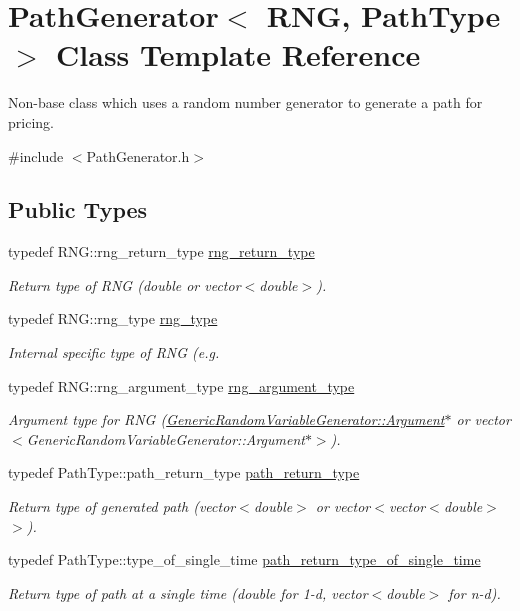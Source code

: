 \hypertarget{class_path_generator}{}\section{Path\+Generator$<$ R\+NG, Path\+Type $>$ Class Template Reference}
\label{class_path_generator}


Non-\/base class which uses a random number generator to generate a path for pricing.  




{\ttfamily \#include $<$Path\+Generator.\+h$>$}

\subsection*{Public Types}
\begin{DoxyCompactItemize}
\item 
typedef R\+N\+G\+::rng\+\_\+return\+\_\+type \hyperlink{class_path_generator_aa97ab7e55299daa0f38539816f171369}{rng\+\_\+return\+\_\+type}
\begin{DoxyCompactList}\small\item\em Return type of R\+NG (double or vector$<$double$>$). \end{DoxyCompactList}\item 
typedef R\+N\+G\+::rng\+\_\+type \hyperlink{class_path_generator_a7e71cbb5376b07b319b1f042a1035335}{rng\+\_\+type}
\begin{DoxyCompactList}\small\item\em Internal specific type of R\+NG (e.\+g. \end{DoxyCompactList}\item 
typedef R\+N\+G\+::rng\+\_\+argument\+\_\+type \hyperlink{class_path_generator_a2f6a701b324534da9f05ccc11c320e6b}{rng\+\_\+argument\+\_\+type}
\begin{DoxyCompactList}\small\item\em Argument type for R\+NG (\hyperlink{class_generic_random_variable_generator_1_1_argument}{Generic\+Random\+Variable\+Generator\+::\+Argument}$\ast$ or vector$<$\+Generic\+Random\+Variable\+Generator\+::\+Argument$\ast$$>$). \end{DoxyCompactList}\item 
typedef Path\+Type\+::path\+\_\+return\+\_\+type \hyperlink{class_path_generator_a7c8e36c418bdb1d8e99c44ac75a5e02a}{path\+\_\+return\+\_\+type}
\begin{DoxyCompactList}\small\item\em Return type of generated path (vector$<$double$>$ or vector$<$vector$<$double$>$$>$). \end{DoxyCompactList}\item 
typedef Path\+Type\+::type\+\_\+of\+\_\+single\+\_\+time \hyperlink{class_path_generator_a467bc3ddaa5e9104170550617e767349}{path\+\_\+return\+\_\+type\+\_\+of\+\_\+single\+\_\+time}
\begin{DoxyCompactList}\small\item\em Return type of path at a single time (double for 1-\/d, vector$<$double$>$ for n-\/d). \end{DoxyCompactList}\end{DoxyCompactItemize}
